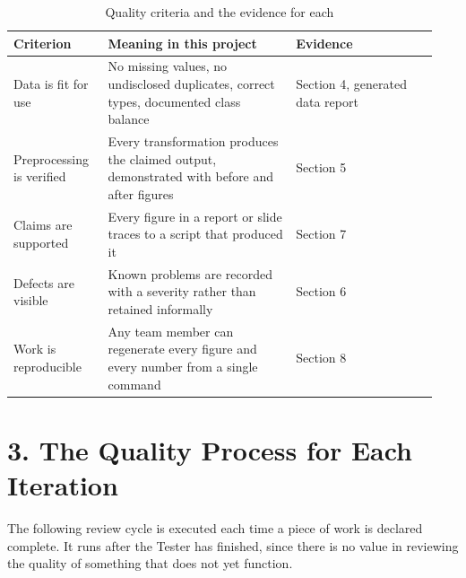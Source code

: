 \documentclass[11pt,a4paper]{article}
\begin{document}
\begin{table}[!t]
\centering
\caption{Quality criteria and the evidence for each}
\small
\setlength{\tabcolsep}{3pt}
\begin{tabular}{p{0.209\linewidth}p{0.418\linewidth}p{0.313\linewidth}}
\toprule
\textbf{Criterion} & \textbf{Meaning in this project} & \textbf{Evidence} \\
\midrule
Data is fit for use & No missing values, no undisclosed duplicates, correct types, documented class balance & Section 4, generated data report \\
Preprocessing is verified & Every transformation produces the claimed output, demonstrated with before and after figures & Section 5 \\
Claims are supported & Every figure in a report or slide traces to a script that produced it & Section 7 \\
Defects are visible & Known problems are recorded with a severity rather than retained informally & Section 6 \\
Work is reproducible & Any team member can regenerate every figure and every number from a single command & Section 8 \\
\bottomrule
\end{tabular}
\end{table}

\section{3. The Quality Process for Each Iteration}
The following review cycle is executed each time a piece of work is declared complete. It runs after the Tester has finished, since there is no value in reviewing the quality of something that does not yet function.
\end{document}
